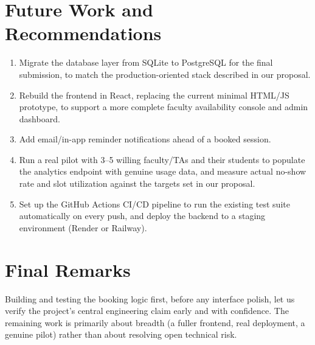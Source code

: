 \documentclass{tietreport}
\begin{document}
\section{Future Work and Recommendations}

\begin{enumerate}
  \item Migrate the database layer from SQLite to
    PostgreSQL for the final submission, to match the
    production-oriented stack described in our proposal.
  \item Rebuild the frontend in React, replacing the
    current minimal HTML/JS prototype, to support a more
    complete faculty availability console and admin
    dashboard.
  \item Add email/in-app reminder notifications ahead of a
    booked session.
  \item Run a real pilot with 3--5 willing faculty/TAs and
    their students to populate the analytics endpoint with
    genuine usage data, and measure actual no-show rate and
    slot utilization against the targets set in our
    proposal.
  \item Set up the GitHub Actions CI/CD pipeline to run the
    existing test suite automatically on every push, and
    deploy the backend to a staging environment (Render or
    Railway).
\end{enumerate}

\section{Final Remarks}

Building and testing the booking logic first, before any
interface polish, let us verify the project's central
engineering claim early and with confidence. The remaining
work is primarily about breadth (a fuller frontend, real
deployment, a genuine pilot) rather than about resolving
open technical risk.


\printbibliography[heading=bibintoc]
\end{document}
